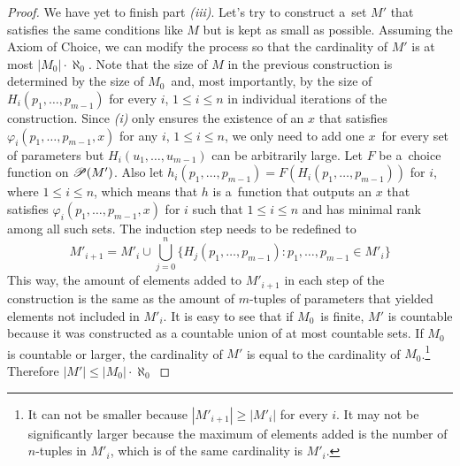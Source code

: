 \begin{proof}
We have yet to finish part \emph{(iii)}.
Let's try to construct a~set $M'$ that satisfies the same conditions like $M$ but is kept as small as possible. Assuming the Axiom of Choice, we can modify the process so that the cardinality of $M'$ is at most $|M_0| \cdot \aleph_0$. Note that the size of $M$ in the previous construction is determined by the size of $M_0$ and, most importantly, by the size of $H_i(p_1, \ldots, p_{m-1})$ for every $i$, $1 \leq i \leq n$ in individual iterations of the construction. Since \emph{(i)} only ensures the existence of an $x$ that satisfies $\varphi_i(p_1, \ldots, p_{m-1}, x)$ for any $i$, $1 \leq i \leq n$, we only need to add one $x$ for every set of parameters but $H_i(u_1, \dots, u_{m-1})$ can be arbitrarily large. Let $F$ be a~choice function on $\mathscr{P} (M')$. Also let $h_i(p_1, \ldots, p_{m-1}) = F(H_i(p_1, \ldots, p_{m-1}))$ for $i$, where $1 \leq i \leq n$, which means that $h$ is a~function that outputs an $x$ that satisfies $\varphi_i(p_1, \ldots, p_{m-1}, x)$ for $i$ such that $1 \leq i \leq n$ and has minimal rank among all such sets. The induction step needs to be redefined to
\begin{equation}
M'_{i+1} = M'_i \cup \bigcup_{j=0}^n \{ H_j(p_1, \ldots, p_{m-1}): p_1, \ldots, p_{m-1} \in M'_i \}
\end{equation}
This way, the amount of elements added to $M'_{i+1}$ in each step of the construction is the same as the amount of $m$-tuples of parameters that yielded elements not included in $M'_i$. It is easy to see that if $M_0$ is finite, $M'$ is countable because it was constructed as a countable union of at most countable sets. If $M_0$ is countable or larger, the cardinality of $M'$ is equal to the cardinality of $M_0$.\footnote{It can not be smaller because $|M'_{i+1}|  \geq |M'_i|$ for every $i$. It may not be significantly larger because the maximum of elements added is the number of $n$-tuples in $M'_i$, which is of the same cardinality is $M'_i$.}
Therefore $|M'| \leq |M_0| \cdot \aleph_0$
\end{proof}

